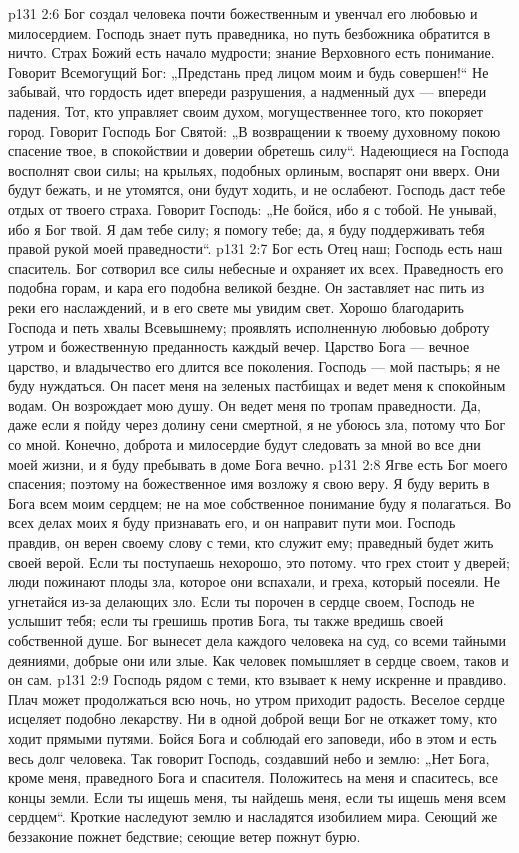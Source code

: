 \vs p131 2:6 Бог создал человека почти божественным и увенчал его любовью и милосердием. Господь знает путь праведника, но путь безбожника обратится в ничто. Страх Божий есть начало мудрости; знание Верховного есть понимание. Говорит Всемогущий Бог: „Предстань пред лицом моим и будь совершен!“ Не забывай, что гордость идет впереди разрушения, а надменный дух --- впереди падения. Тот, кто управляет своим духом, могущественнее того, кто покоряет город. Говорит Господь Бог Святой: „В возвращении к твоему духовному покою спасение твое, в спокойствии и доверии обретешь силу“. Надеющиеся на Господа восполнят свои силы; на крыльях, подобных орлиным, воспарят они вверх. Они будут бежать, и не утомятся, они будут ходить, и не ослабеют. Господь даст тебе отдых от твоего страха. Говорит Господь: „Не бойся, ибо я с тобой. Не унывай, ибо я Бог твой. Я дам тебе силу; я помогу тебе; да, я буду поддерживать тебя правой рукой моей праведности“.
\vs p131 2:7 Бог есть Отец наш; Господь есть наш спаситель. Бог сотворил все силы небесные и охраняет их всех. Праведность его подобна горам, и кара его подобна великой бездне. Он заставляет нас пить из реки его наслаждений, и в его свете мы увидим свет. Хорошо благодарить Господа и петь хвалы Всевышнему; проявлять исполненную любовью доброту утром и божественную преданность каждый вечер. Царство Бога --- вечное царство, и владычество его длится все поколения. Господь --- мой пастырь; я не буду нуждаться. Он пасет меня на зеленых пастбищах и ведет меня к спокойным водам. Он возрождает мою душу. Он ведет меня по тропам праведности. Да, даже если я пойду через долину сени смертной, я не убоюсь зла, потому что Бог со мной. Конечно, доброта и милосердие будут следовать за мной во все дни моей жизни, и я буду пребывать в доме Бога вечно.
\vs p131 2:8 Ягве есть Бог моего спасения; поэтому на божественное имя возложу я свою веру. Я буду верить в Бога всем моим сердцем; не на мое собственное понимание буду я полагаться. Во всех делах моих я буду признавать его, и он направит пути мои. Господь правдив, он верен своему слову с теми, кто служит ему; праведный будет жить своей верой. Если ты поступаешь нехорошо, это потому. что грех стоит у дверей; люди пожинают плоды зла, которое они вспахали, и греха, который посеяли. Не угнетайся из\hyp{}за делающих зло. Если ты порочен в сердце своем, Господь не услышит тебя; если ты грешишь против Бога, ты также вредишь своей собственной душе. Бог вынесет дела каждого человека на суд, со всеми тайными деяниями, добрые они или злые. Как человек помышляет в сердце своем, таков и он сам.
\vs p131 2:9 Господь рядом с теми, кто взывает к нему искренне и правдиво. Плач может продолжаться всю ночь, но утром приходит радость. Веселое сердце исцеляет подобно лекарству. Ни в одной доброй вещи Бог не откажет тому, кто ходит прямыми путями. Бойся Бога и соблюдай его заповеди, ибо в этом и есть весь долг человека. Так говорит Господь, создавший небо и землю: „Нет Бога, кроме меня, праведного Бога и спасителя. Положитесь на меня и спаситесь, все концы земли. Если ты ищешь меня, ты найдешь меня, если ты ищешь меня всем сердцем“. Кроткие наследуют землю и насладятся изобилием мира. Сеющий же беззаконие пожнет бедствие; сеющие ветер пожнут бурю.
